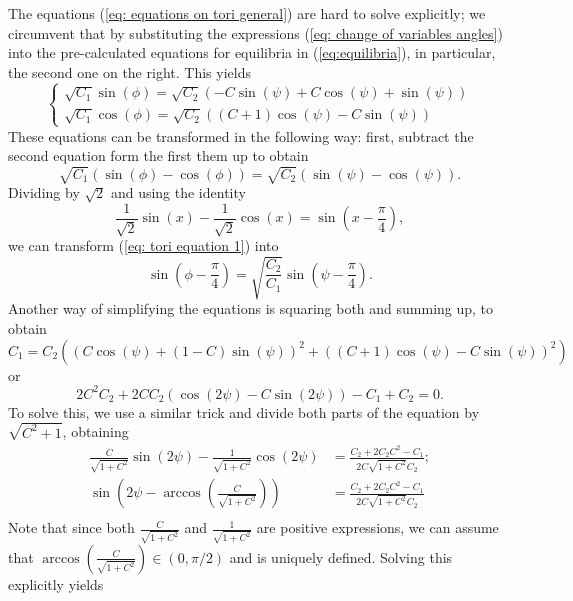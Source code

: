\documentclass{article}
\theoremstyle{definition}
\numberwithin{equation}{section}
\begin{document}
The equations (\ref{eq: equations on tori general}) are hard to solve explicitly; we circumvent that by substituting the expressions (\ref{eq: change of variables angles}) into the pre-calculated equations for equilibria in (\ref{eq:equilibria}), in particular, the second one on the right. This yields
\begin{equation}
    \label{eq: equilibiria tori}
    \begin{cases}
       \sqrt{C_1} \sin (\phi )=\sqrt{C_2} (-C \sin (\psi )+C \cos (\psi )+\sin (\psi ))\\
        \sqrt{C_1} \cos (\phi )=\sqrt{C_2} ((C+1) \cos (\psi )-C \sin (\psi ))
    \end{cases}
\end{equation}
These equations can be transformed in the following way: first, subtract the second equation form the first  them up to obtain
\begin{equation}
    \label{eq: tori equation 1}
    \sqrt{C_1}\left(\sin(\phi) - \cos(\phi)\right) = \sqrt{C_2}\left(\sin(\psi) -\cos(\psi)\right).
\end{equation}
Dividing by $\sqrt{2}$ and using the identity 
\[\frac{1}{\sqrt{2}}\sin(x) - \frac{1}{\sqrt{2}}\cos(x) = \sin\left(x - \frac{\pi}{4}\right),\]  we can transform (\ref{eq: tori equation 1}) into
\begin{equation}
    \label{eq: equation 1 tori final form}
    \sin\left(\phi-\frac{\pi}{4}\right)  = \sqrt{\frac{C_2}{C_1}}\sin\left(\psi-\frac{\pi}{4}\right).
\end{equation}
Another way of simplifying the equations is squaring both and summing up, to obtain
\[
C_1 = C_2\left(\left(C \cos(\psi) + (1-C)\sin(\psi)\right)^2 + \left((C+1)\cos(\psi) - C\sin(\psi)\right)^2\right)
\]
or
\[
2 C^2 C_2+2 C C_2 (\cos (2 \psi )-C \sin (2 \psi ))-C_1+C_2=0. 
\]
To solve this, we use a similar trick and divide both parts of the equation by $\sqrt{C^2+1}$, obtaining
\begin{equation}
    \begin{split}
         \frac{C}{\sqrt{1+C^2}}\sin(2\psi) -\frac{1}{\sqrt{1+C^2}}\cos(2\psi)  &= \frac{C_2+2C_2C^2-C_1}
        {2C\sqrt{1+C^2}C_2};\\
        \sin\left(2\psi  - \arccos\left(\frac{C}{\sqrt{1 +C^2}}\right)\right) &=\frac{C_2+2C_2C^2-C_1}
        {2C\sqrt{1+C^2}C_2}\\
        \end{split}
        \end{equation}
Note that since both $\frac{C}{\sqrt{1 + C^2}}$ and $\frac{1}{\sqrt{1 + C^2}}$ are positive expressions, we can assume that $\arccos\left(\frac{C}{\sqrt{1 + C^2}}\right)\in\left(0,\pi/2\right)$ and is uniquely defined.  Solving this explicitly yields
\end{document}
